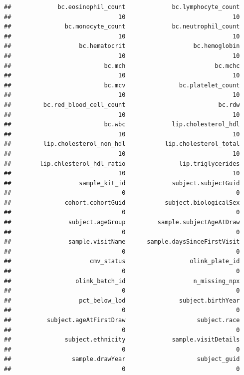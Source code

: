 \documentclass[
]{article}
\begin{document}
\begin{verbatim}
##             bc.eosinophil_count             bc.lymphocyte_count 
##                              10                              10 
##               bc.monocyte_count             bc.neutrophil_count 
##                              10                              10 
##                   bc.hematocrit                   bc.hemoglobin 
##                              10                              10 
##                          bc.mch                         bc.mchc 
##                              10                              10 
##                          bc.mcv               bc.platelet_count 
##                              10                              10 
##         bc.red_blood_cell_count                          bc.rdw 
##                              10                              10 
##                          bc.wbc             lip.cholesterol_hdl 
##                              10                              10 
##         lip.cholesterol_non_hdl           lip.cholesterol_total 
##                              10                              10 
##        lip.chlesterol_hdl_ratio               lip.triglycerides 
##                              10                              10 
##                   sample_kit_id             subject.subjectGuid 
##                               0                               0 
##               cohort.cohortGuid           subject.biologicalSex 
##                               0                               0 
##                subject.ageGroup         sample.subjectAgeAtDraw 
##                               0                               0 
##                sample.visitName      sample.daysSinceFirstVisit 
##                               0                               0 
##                      cmv_status                  olink_plate_id 
##                               0                               0 
##                  olink_batch_id                   n_missing_npx 
##                               0                               0 
##                   pct_below_lod               subject.birthYear 
##                               0                               0 
##          subject.ageAtFirstDraw                    subject.race 
##                               0                               0 
##               subject.ethnicity             sample.visitDetails 
##                               0                               0 
##                 sample.drawYear                    subject_guid 
##                               0                               0
\end{verbatim}
\end{document}
